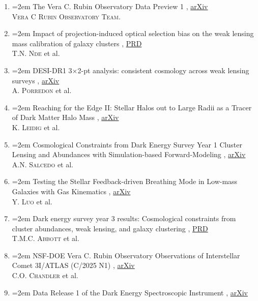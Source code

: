 \documentclass{scrartcl}
\newcommand{\paper}[1]{\noindent\hangindent=2em\hangafter=0 \footnotesize #1  %
\vspace{0.5em}} %
\begin{document}
\begin{cv}{}
    \vspace{0.2em}
    \begin{enumerate}
        \item \paper{The Vera C. Rubin Observatory Data Preview 1}, \href{https://arxiv.org/abs/2603.23786}{arXiv}\\
        \textsc{Vera C Rubin Observatory Team}.
        \item \paper{Impact of projection-induced optical selection bias on the weak lensing mass calibration of galaxy clusters}, \href{https://journals.aps.org/prd/abstract/10.1103/h9xq-k9gh}{PRD}\\
        \textsc{T.N. Nde} et al.
        \item \paper{DESI-DR1 3×2-pt analysis: consistent cosmology across weak lensing surveys}, \href{https://arxiv.org/abs/2512.15960}{arXiv}\\
        \textsc{A. Porredon} et al.
        \item \paper{Reaching for the Edge II: Stellar Halos out to Large Radii as a Tracer of Dark Matter Halo Mass}, \href{https://arxiv.org/abs/2511.10723}{arXiv}\\
        \textsc{K. Leidig} et al.
        \item \paper{Cosmological Constraints from Dark Energy Survey Year 1 Cluster Lensing and Abundances with Simulation-based Forward-Modeling}, \href{https://arxiv.org/abs/2510.25706}{arXiv}\\
        \textsc{A.N. Salcedo} et al.
        \item \paper{Testing the Stellar Feedback-driven Breathing Mode in Low-mass Galaxies with Gas Kinematics}, \href{https://arxiv.org/abs/2510.17996}{arXiv}\\
        \textsc{Y. Luo} et al.
        \item \paper{Dark energy survey year 3 results: Cosmological constraints from cluster abundances, weak lensing, and galaxy clustering}, \href{https://journals.aps.org/prd/abstract/10.1103/3dzh-d8f5}{PRD}\\
        \textsc{T.M.C. Abbott} et al.
        \item \paper{NSF-DOE Vera C. Rubin Observatory Observations of Interstellar Comet 3I/ATLAS (C/2025 N1)}, \href{https://arxiv.org/abs/2507.13409}{arXiv}\\
        \textsc{C.O. Chandler} et al.
        \item \paper{Data Release 1 of the Dark Energy Spectroscopic Instrument}, \href{https://arxiv.org/abs/2503.14745}{arXiv}\\

\end{enumerate}
\end{cv}
\end{document}
